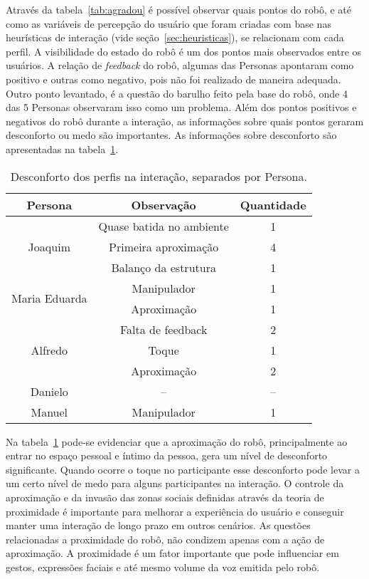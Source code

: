 Através da tabela~\ref{tab:agradou} é possível observar quais pontos do robô, e até como as variáveis de percepção do usuário que foram criadas com base nas heurísticas de interação (vide seção~\ref{sec:heuristicas}), se relacionam com cada perfil. A visibilidade do estado do robô é um dos pontos mais observados entre os usuários. A relação de \emph{feedback} do robô, algumas das Personas apontaram como positivo e outras como negativo, pois não foi realizado de maneira adequada. Outro ponto levantado, é a questão do barulho feito pela base do robô, onde 4 das 5 Personas observaram isso como um problema. Além dos pontos positivos e negativos do robô durante a interação, as informações sobre quais pontos geraram desconforto ou medo são importantes. As informações sobre desconforto são apresentadas na tabela~\ref{tab:desconforto}.

\begin{table}[!ht]
	\caption{Desconforto dos perfis na interação, separados por Persona.}
	\label{tab:desconforto}
	\centering
	\begin{tabular}{c | c | c }
        \hline
        Persona & Observação & Quantidade \\
        \hline
        \multirow{3}{*}{Joaquim} & Quase batida no ambiente & 1 \\
        \hhline{~--}
        & Primeira aproximação & 4 \\
        \hhline{~--}
        & Balanço da estrutura & 1 \\
        \hline
        \multirow{2}{*}{Maria Eduarda} & Manipulador & 1 \\
        \hhline{~--}
        & Aproximação & 1 \\
        \hline
        \multirow{3}{*}{Alfredo} & Falta de feedback & 2 \\
        \hhline{~--}
        & Toque & 1 \\
        \hhline{~--}
        & Aproximação & 2 \\
        \hline
        Danielo & -- & -- \\
        \hline
        Manuel & Manipulador & 1 \\
        \hline
    \end{tabular}
\end{table}

Na tabela~\ref{tab:desconforto} pode-se evidenciar que a aproximação do robô, principalmente ao entrar no espaço pessoal e íntimo da pessoa, gera um nível de desconforto significante. Quando ocorre o toque no participante esse desconforto pode levar a um certo nível de medo para alguns participantes na interação. O controle da aproximação e da invasão das zonas sociais definidas através da teoria de proximidade é importante para melhorar a experiência do usuário e conseguir manter uma interação de longo prazo em outros cenários. As questões relacionadas a proximidade do robô, não condizem apenas com a ação de aproximação. A proximidade é um fator importante que pode influenciar em gestos, expressões faciais e até mesmo volume da voz emitida pelo robô.

